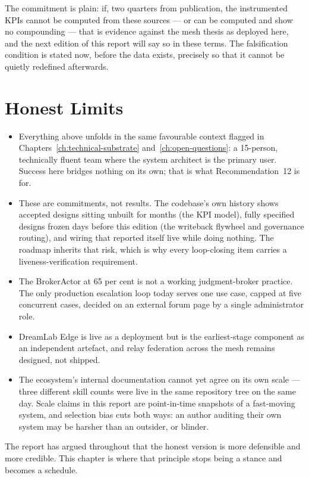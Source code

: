 The commitment is plain: if, two quarters from publication, the instrumented KPIs cannot be computed from these sources --- or can be computed and show no compounding --- that is evidence against the mesh thesis as deployed here, and the next edition of this report will say so in these terms. The falsification condition is stated now, before the data exists, precisely so that it cannot be quietly redefined afterwards.

\section{Honest Limits}

\begin{cautionbox}[title={What This Chapter Does Not Claim}]
\begin{itemize}
  \item Everything above unfolds in the same favourable context flagged in Chapters~\ref{ch:technical-substrate} and~\ref{ch:open-questions}: a 15-person, technically fluent team where the system architect is the primary user. Success here bridges nothing on its own; that is what Recommendation~12 is for.
  \item These are commitments, not results. The codebase's own history shows accepted designs sitting unbuilt for months (the KPI model), fully specified designs frozen days before this edition (the writeback flywheel and governance routing), and wiring that reported itself live while doing nothing. The roadmap inherits that risk, which is why every loop-closing item carries a liveness-verification requirement.
  \item The BrokerActor at 65 per cent is not a working judgment-broker practice. The only production escalation loop today serves one use case, capped at five concurrent cases, decided on an external forum page by a single administrator role.
  \item DreamLab Edge is live as a deployment but is the earliest-stage component as an independent artefact, and relay federation across the mesh remains designed, not shipped.
  \item The ecosystem's internal documentation cannot yet agree on its own scale --- three different skill counts were live in the same repository tree on the same day. Scale claims in this report are point-in-time snapshots of a fast-moving system, and selection bias cuts both ways: an author auditing their own system may be harsher than an outsider, or blinder.
\end{itemize}
\end{cautionbox}

The report has argued throughout that the honest version is more defensible and more credible. This chapter is where that principle stops being a stance and becomes a schedule.
